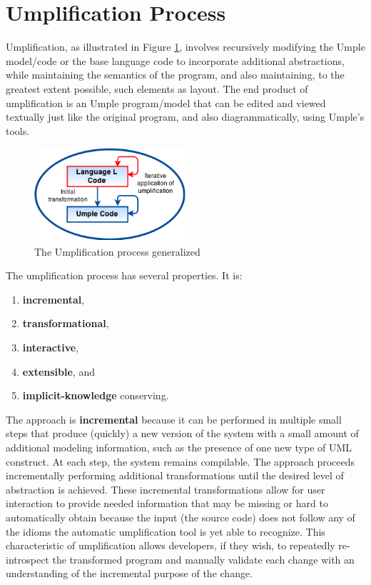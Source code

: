\section{Umplification Process}
Umplification, as illustrated in Figure \ref{fig:umplificationLoop}, involves recursively modifying the Umple model/code or the base language code to incorporate additional abstractions, while maintaining the semantics of the program, and also maintaining, to the greatest extent possible, such elements as layout. The end product of umplification is an Umple program/model that can be edited and viewed textually just like the original program, and also diagrammatically, using Umple's tools. 

\begin{figure}[h]
\centering
\includegraphics[width=0.50\textwidth]{Figures/UmplificationProcess.png}
\caption{The Umplification process generalized}
\label{fig:umplificationLoop}
\end{figure}

The umplification process has several properties. It is:
\begin{enumerate}
 \item \textbf{incremental}, 
 \item \textbf{transformational},
 \item \textbf{interactive},  
 \item \textbf{extensible}, and
 \item \textbf{implicit-knowledge} conserving. 
\end{enumerate}

The approach is \textbf{incremental} because it can be performed in multiple small steps that produce (quickly) a new version of the system with a small amount of additional modeling information, such as the presence of one new type of UML construct. At each step, the system remains compilable. The approach proceeds incrementally performing additional transformations until the desired level of abstraction is achieved.	These incremental transformations allow for user interaction to provide needed information that may be missing or hard to automatically obtain because the input (the source code) does not follow any of the idioms the automatic umplification tool is yet able to recognize. This characteristic of umplification allows developers, if they wish, to repeatedly re-introspect the transformed program and manually validate each change with an understanding of the incremental purpose of the change.

